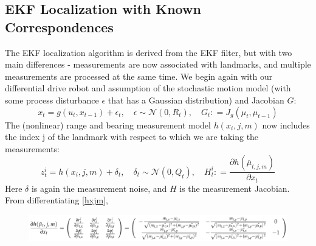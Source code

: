 \documentclass[twoside]{article}
\begin{document}
\subsection{EKF Localization with Known Correspondences}
The EKF localization algorithm is derived from the EKF filter, but with two main differences - measurements are now associated with landmarks, and multiple measurements are processed at the same time. We begin again with our differential drive robot and assumption of the stochastic motion model (with some process disturbance $\epsilon$ that has a Gaussian distribution) and Jacobian $G$:
\begin{equation}
    x _ { t } = g \left( u _ { t } , x _ { t - 1 } \right) + \epsilon _ { t } , \quad \epsilon \sim \mathcal { N } \left( 0 , R _ { t } \right) , \quad G _ { t } : = J _ { g } \left( \mu _ { t } , \mu _ { t - 1 } \right)
\end{equation}
The (nonlinear) range and bearing measurement model $h(x_i, j, m)$ now includes the index j of the landmark with respect to which we are taking the measurements:
\begin{equation}
    z _ { t } ^ { i } = h \left( x _ { i } , j , m \right) + \delta _ { t } , \quad \delta _ { t } \sim \mathcal { N } \left( 0 , Q _ { t } \right) , \quad H _ { t } ^ { i } : = \frac { \partial h \left( \overline { \mu } _ { t , j , m } \right) } { \partial x _ { t } }
\end{equation}
Here $\delta$ is again the measurement noise, and $H$ is the measurement Jacobian. From differentiating \ref{hxjm},

\begin{figure}[H]
\centering
\includegraphics[width=.7\linewidth]{BigEquation.png}
\label{fig:BigPartialEquation}
\end{figure}
\end{document}
